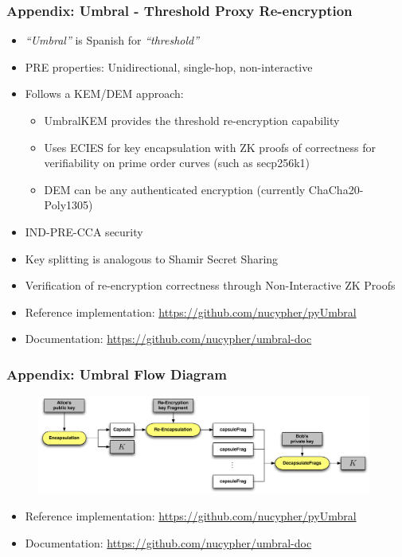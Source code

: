 \documentclass[xetex,mathsans,sans,aspectratio=169]{beamer}
\begin{document}
    \begin{frame}
        \frametitle{Appendix: Umbral - Threshold Proxy Re-encryption}
        \begin{itemize}
          \item \emph{``Umbral''} is Spanish for \emph{``threshold''}
          \item PRE properties: Unidirectional, single-hop, non-interactive
          \item Follows a KEM/DEM approach:
            \begin{itemize}
	      \item UmbralKEM provides the threshold re-encryption capability
              \item Uses ECIES for key encapsulation with ZK proofs of correctness for verifiability on prime order curves (such as secp256k1)
              \item DEM can be any authenticated encryption (currently ChaCha20-Poly1305)
            \end{itemize}
	  \item IND-PRE-CCA security
          \item Key splitting is analogous to Shamir Secret Sharing
	  \item Verification of re-encryption correctness through Non-Interactive ZK Proofs
          \item Reference implementation: \url{https://github.com/nucypher/pyUmbral}
	  \item Documentation: \url{https://github.com/nucypher/umbral-doc}
        \end{itemize}
    \end{frame}
    
    \begin{frame}
      \frametitle{Appendix: Umbral Flow Diagram}
      \begin{figure}
        \centering
        \includegraphics[width=11cm]{pdf/umbral-kem-flow.pdf}
      \end{figure}
      \begin{itemize}
           \item Reference implementation: \url{https://github.com/nucypher/pyUmbral}
           \item Documentation: \url{https://github.com/nucypher/umbral-doc}
      \end{itemize}
    \end{frame}
\end{document}
